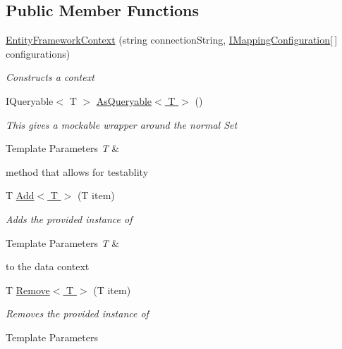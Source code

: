 \subsection*{Public Member Functions}
\begin{DoxyCompactItemize}
\item 
\hyperlink{class_highway_1_1_data_1_1_entity_framework_1_1_contexts_1_1_entity_framework_context_a45502d0390821379b888a6b9e712e8b5}{Entity\-Framework\-Context} (string connection\-String, \hyperlink{interface_highway_1_1_data_1_1_entity_framework_1_1_mappings_1_1_i_mapping_configuration}{I\-Mapping\-Configuration}\mbox{[}$\,$\mbox{]} configurations)
\begin{DoxyCompactList}\small\item\em Constructs a context \end{DoxyCompactList}\item 
I\-Queryable$<$ T $>$ \hyperlink{class_highway_1_1_data_1_1_entity_framework_1_1_contexts_1_1_entity_framework_context_a4af775d2ca582477cfc53daa5903fab5}{As\-Queryable$<$ T $>$} ()
\begin{DoxyCompactList}\small\item\em This gives a mockable wrapper around the normal Set
\begin{DoxyTemplParams}{Template Parameters}
{\em T} & \\
\hline
\end{DoxyTemplParams}
method that allows for testablity \end{DoxyCompactList}\item 
T \hyperlink{class_highway_1_1_data_1_1_entity_framework_1_1_contexts_1_1_entity_framework_context_a8d50357ea11414364e9155ef79048b21}{Add$<$ T $>$} (T item)
\begin{DoxyCompactList}\small\item\em Adds the provided instance of 
\begin{DoxyTemplParams}{Template Parameters}
{\em T} & \\
\hline
\end{DoxyTemplParams}
to the data context \end{DoxyCompactList}\item 
T \hyperlink{class_highway_1_1_data_1_1_entity_framework_1_1_contexts_1_1_entity_framework_context_a36b80fcc6db41fd1036bbc4ea466294b}{Remove$<$ T $>$} (T item)
\begin{DoxyCompactList}\small\item\em Removes the provided instance of 
\begin{DoxyTemplParams}{Template Parameters}

\end{DoxyTemplParams}
\end{DoxyCompactList}
\end{DoxyCompactItemize}
